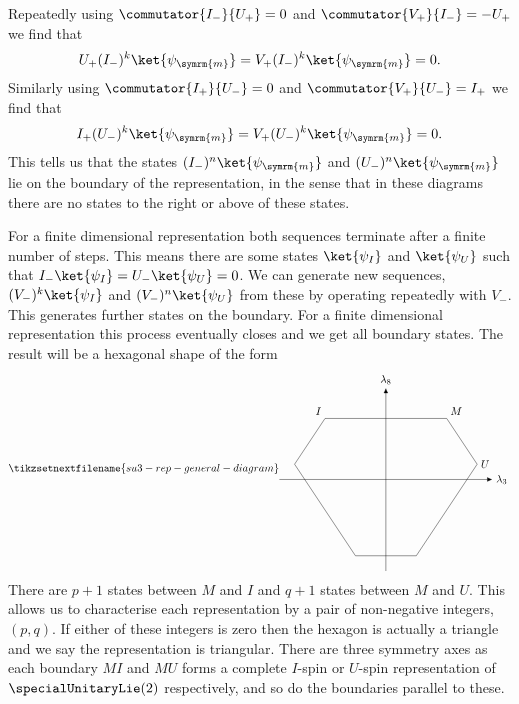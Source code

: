 \documentclass[fleqn]{NotesClass}
\begin{document}
    Repeatedly using \(\commutator{I_-}{U_+} = 0\) and \(\commutator{V_+}{I_-} = -U_+\) we find that
    \begin{equation}
        U_+(I_-)^k \ket{\psi_{\symrm{m}}} = V_+(I_-)^k \ket{\psi_{\symrm{m}}} = 0.
    \end{equation}
    Similarly using \(\commutator{I_+}{U_-} = 0\) and \(\commutator{V_+}{U_-} = I_+\) we find that
    \begin{equation}
        I_+ (U_-)^k \ket{\psi_{\symrm{m}}} = V_{+}(U_-)^k \ket{\psi_{\symrm{m}}} = 0.
    \end{equation}
    This tells us that the states \((I_-)^n\ket{\psi_{\symrm{m}}}\) and \((U_-)^n\ket{\psi_{\symrm{m}}}\) lie on the boundary of the representation, in the sense that in these diagrams there are no states to the right or above of these states.
    
    For a finite dimensional representation both sequences terminate after a finite number of steps.
    This means there are some states \(\ket{\psi_I}\) and \(\ket{\psi_U}\) such that \(I_-\ket{\psi_I} = U_-\ket{\psi_U} = 0\).
    We can generate new sequences, \((V_-)^k\ket{\psi_I}\) and \((V_-)^n\ket{\psi_U}\) from these by operating repeatedly with \(V_-\).
    This generates further states on the boundary.
    For a finite dimensional representation this process eventually closes and we get all boundary states.
    The result will be a hexagonal shape of the form
    \begin{equation}
        \tikzsetnextfilename{su3-rep-general-diagram}
        \begin{tikzpicture}[
            >={Latex[width=1.5mm]},
            baseline = (current bounding box)
            ]
            \draw (-2, 2) node [above left] {\(I\)} -- (2, 2) node [above right] {\(M\)} -- (3, 0.5) node [right] {\(U\)} -- (1, -2.5) -- (-1, -2.5) -- (-3, 0.5) -- cycle;
            \draw[->] (-3.5, 0) -- (3.5, 0) node [right] {\(\lambda_3\)};
            \draw[->] (0, -3) -- (0, 3) node [above] {\(\lambda_8\)};
        \end{tikzpicture}
    \end{equation}
    There are \(p + 1\) states between \(M\) and \(I\) and \(q + 1\) states between \(M\) and \(U\).
    This allows us to characterise each representation by a pair of non-negative integers, \((p, q)\).
    If either of these integers is zero then the hexagon is actually a triangle and we say the representation is triangular.
    There are three symmetry axes as each boundary \(MI\) and \(MU\) forms a complete \(I\)-spin or \(U\)-spin representation of \(\specialUnitaryLie(2)\) respectively, and so do the boundaries parallel to these.
    
\end{document}
